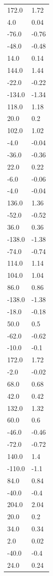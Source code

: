 \begin{longtable}{ll}
172.0 & 1.72 \\
4.0 & 0.04 \\
-76.0 & -0.76 \\
-48.0 & -0.48 \\
14.0 & 0.14 \\
144.0 & 1.44 \\
-22.0 & -0.22 \\
-134.0 & -1.34 \\
118.0 & 1.18 \\
20.0 & 0.2 \\
102.0 & 1.02 \\
-4.0 & -0.04 \\
-36.0 & -0.36 \\
22.0 & 0.22 \\
-6.0 & -0.06 \\
-4.0 & -0.04 \\
136.0 & 1.36 \\
-52.0 & -0.52 \\
36.0 & 0.36 \\
-138.0 & -1.38 \\
-74.0 & -0.74 \\
114.0 & 1.14 \\
104.0 & 1.04 \\
86.0 & 0.86 \\
-138.0 & -1.38 \\
-18.0 & -0.18 \\
50.0 & 0.5 \\
-62.0 & -0.62 \\
-10.0 & -0.1 \\
172.0 & 1.72 \\
-2.0 & -0.02 \\
68.0 & 0.68 \\
42.0 & 0.42 \\
132.0 & 1.32 \\
60.0 & 0.6 \\
-46.0 & -0.46 \\
-72.0 & -0.72 \\
140.0 & 1.4 \\
-110.0 & -1.1 \\
84.0 & 0.84 \\
-40.0 & -0.4 \\
204.0 & 2.04 \\
20.0 & 0.2 \\
34.0 & 0.34 \\
2.0 & 0.02 \\
-40.0 & -0.4 \\
24.0 & 0.24 \\

\end{longtable}
